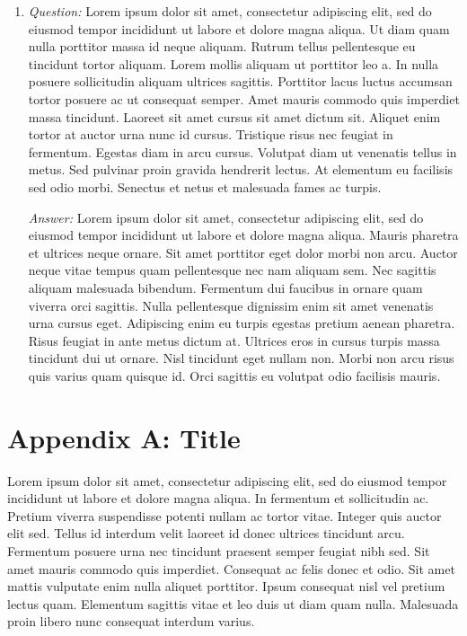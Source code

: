 \documentclass[10pt,letterpaper]{article}
\begin{document}
\begin{enumerate}
  \item \textit{Question:} Lorem ipsum dolor sit amet, consectetur adipiscing elit, sed do eiusmod tempor incididunt ut labore et dolore magna aliqua. Ut diam quam nulla porttitor massa id neque aliquam. Rutrum tellus pellentesque eu tincidunt tortor aliquam. Lorem mollis aliquam ut porttitor leo a. In nulla posuere sollicitudin aliquam ultrices sagittis. Porttitor lacus luctus accumsan tortor posuere ac ut consequat semper. Amet mauris commodo quis imperdiet massa tincidunt. Laoreet sit amet cursus sit amet dictum sit. Aliquet enim tortor at auctor urna nunc id cursus. Tristique risus nec feugiat in fermentum. Egestas diam in arcu cursus. Volutpat diam ut venenatis tellus in metus. Sed pulvinar proin gravida hendrerit lectus. At elementum eu facilisis sed odio morbi. Senectus et netus et malesuada fames ac turpis.

  \bigskip\noindent\textit{Answer:} Lorem ipsum dolor sit amet, consectetur adipiscing elit, sed do eiusmod tempor incididunt ut labore et dolore magna aliqua. Mauris pharetra et ultrices neque ornare. Sit amet porttitor eget dolor morbi non arcu. Auctor neque vitae tempus quam pellentesque nec nam aliquam sem. Nec sagittis aliquam malesuada bibendum. Fermentum dui faucibus in ornare quam viverra orci sagittis. Nulla pellentesque dignissim enim sit amet venenatis urna cursus eget. Adipiscing enim eu turpis egestas pretium aenean pharetra. Risus feugiat in ante metus dictum at. Ultrices eros in cursus turpis massa tincidunt dui ut ornare. Nisl tincidunt eget nullam non. Morbi non arcu risus quis varius quam quisque id. Orci sagittis eu volutpat odio facilisis mauris.
\end{enumerate}

\setcounter{equation}{0}

\section*{Appendix A: Title}

Lorem ipsum dolor sit amet, consectetur adipiscing elit, sed do eiusmod tempor incididunt ut labore et dolore magna aliqua. In fermentum et sollicitudin ac. Pretium viverra suspendisse potenti nullam ac tortor vitae. Integer quis auctor elit sed. Tellus id interdum velit laoreet id donec ultrices tincidunt arcu. Fermentum posuere urna nec tincidunt praesent semper feugiat nibh sed. Sit amet mauris commodo quis imperdiet. Consequat ac felis donec et odio. Sit amet mattis vulputate enim nulla aliquet porttitor. Ipsum consequat nisl vel pretium lectus quam. Elementum sagittis vitae et leo duis ut diam quam nulla. Malesuada proin libero nunc consequat interdum varius.

\setcounter{equation}{0}

\printbibliography[
]
\end{document}
